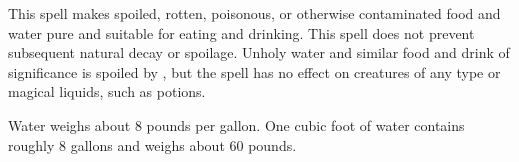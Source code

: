 \begin{spelleffect}
This spell makes spoiled, rotten, poisonous, or otherwise contaminated food and water pure and suitable for eating and drinking. This spell does not prevent subsequent natural decay or spoilage. Unholy water and similar food and drink of significance is spoiled by , but the spell has no effect on creatures of any type or magical liquids, such as potions.
\end{spelleffect}
\begin{spellnotes}
Water weighs about 8 pounds per gallon. One cubic foot of water contains roughly 8 gallons and weighs about 60 pounds.
\end{spellnotes}

